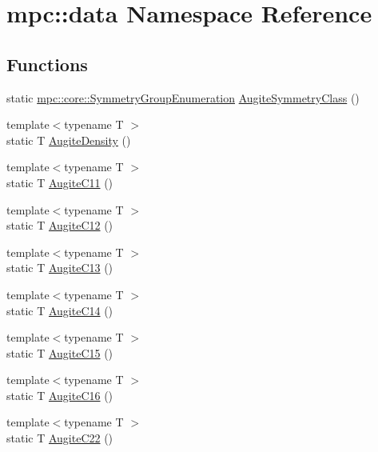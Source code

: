 \hypertarget{namespacempc_1_1data}{}\section{mpc\+:\+:data Namespace Reference}
\label{namespacempc_1_1data}
\subsection*{Functions}
\begin{DoxyCompactItemize}
\item 
static \mbox{\hyperlink{namespacempc_1_1core_a9d979684062547055a0ef5c13077bad8}{mpc\+::core\+::\+Symmetry\+Group\+Enumeration}} \mbox{\hyperlink{namespacempc_1_1data_a6cef2edb2766a0fb3de56fae388d1c3f}{Augite\+Symmetry\+Class}} ()
\item 
{\footnotesize template$<$typename T $>$ }\\static T \mbox{\hyperlink{namespacempc_1_1data_a99f590b7a21e45586f10959610917f50}{Augite\+Density}} ()
\item 
{\footnotesize template$<$typename T $>$ }\\static T \mbox{\hyperlink{namespacempc_1_1data_a619b6ede8355939ad60b6dbab8dd3011}{Augite\+C11}} ()
\item 
{\footnotesize template$<$typename T $>$ }\\static T \mbox{\hyperlink{namespacempc_1_1data_abb8eaf04e7845bfc6effc1c79e859d6e}{Augite\+C12}} ()
\item 
{\footnotesize template$<$typename T $>$ }\\static T \mbox{\hyperlink{namespacempc_1_1data_a845dad178d268b5c7b23f322558f9df1}{Augite\+C13}} ()
\item 
{\footnotesize template$<$typename T $>$ }\\static T \mbox{\hyperlink{namespacempc_1_1data_a6b8e4e099c5214a6561cd129d13c366a}{Augite\+C14}} ()
\item 
{\footnotesize template$<$typename T $>$ }\\static T \mbox{\hyperlink{namespacempc_1_1data_a64fd5a22c0bc9d2a3a20a767bbe9358f}{Augite\+C15}} ()
\item 
{\footnotesize template$<$typename T $>$ }\\static T \mbox{\hyperlink{namespacempc_1_1data_a0a030d694b87dfef87d08230e7891264}{Augite\+C16}} ()
\item 
{\footnotesize template$<$typename T $>$ }\\static T \mbox{\hyperlink{namespacempc_1_1data_a2f04755de801e6346c221171ba0c3968}{Augite\+C22}} ()

\end{DoxyCompactItemize}
